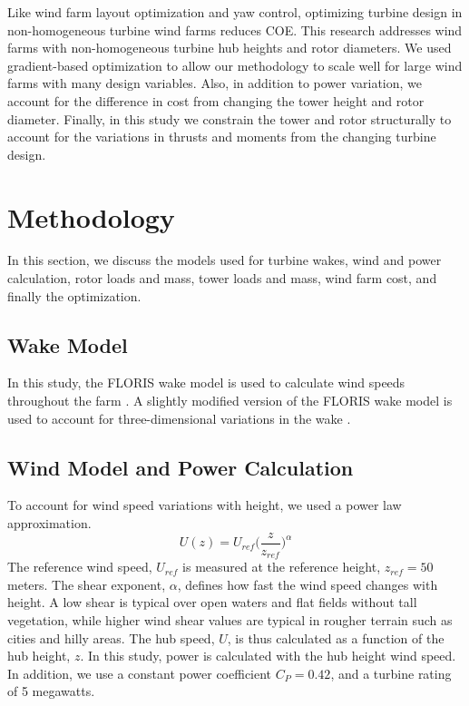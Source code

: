 \documentclass[conf]{new-aiaa}
\begin{document}
Like wind farm layout optimization and yaw control, optimizing turbine design in non-homogeneous turbine wind farms reduces COE. This research addresses wind farms with non-homogeneous turbine hub heights and rotor diameters. We used gradient-based optimization to allow our methodology to scale well for large wind farms with many design variables. Also, in addition to power variation, we account for the difference in cost from changing the tower height and rotor diameter. Finally, in this study we constrain the tower and rotor structurally to account for the variations in thrusts and moments from the changing turbine design.

\section{Methodology}

In this section, we discuss the models used for turbine wakes, wind and power calculation, rotor loads and mass, tower loads and mass, wind farm cost, and finally the optimization.

\subsection{Wake Model}
In this study, the FLORIS wake model is used to calculate wind speeds throughout the farm \cite{Gebraad-yaw-control}. A slightly modified version of the FLORIS wake model is used to account for three-dimensional variations in the wake \cite{stanley2017gradient}.

\subsection{Wind Model and Power Calculation}
To account for wind speed variations with height, we used a power law approximation.
\begin{equation}
	U(z) = U_{ref}\bigg(\frac{z}{z_{ref}}\bigg)^\alpha
    \label{shear}
\end{equation}
The reference wind speed, $U_{ref}$ is measured at the reference height, $z_{ref}=50$ meters. The shear exponent, $\alpha$, defines how fast the wind speed changes with height. A low shear is typical over open waters and flat fields without tall vegetation, while higher wind shear values are typical in rougher terrain such as cities and hilly areas. The hub speed, $U$, is thus calculated as a function of the hub height, $z$. 
In this study, power is calculated with the hub height wind speed. In addition, we use a constant power coefficient $C_P=0.42$, and a turbine rating of 5 megawatts.
\end{document}
